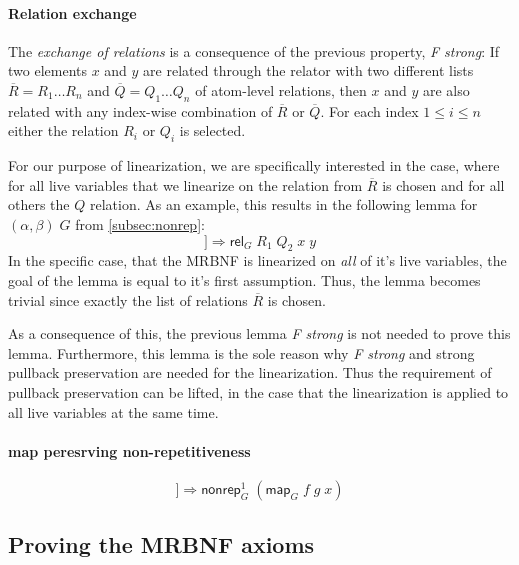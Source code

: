     \paragraph{Relation exchange}
    \label{par:rel_exchange}
      The \textit{exchange of relations} is a consequence of the previous property, \textit{F strong}: If two elements $x$ and $y$ are related through the relator with two different lists $\overline{R} = R_1 \dots R_n$ and $\overline{Q} = Q_1 \dots Q_n$ of atom-level relations, then $x$ and $y$ are also related with any index-wise combination of $\overline{R}$ or $\overline{Q}$. For each index $1 \leq i \leq n$ either the relation $R_i$ or $Q_i$ is selected. 
      
      For our purpose of linearization, we are specifically interested in the case, where for all live variables that we linearize on the relation from $\overline{R}$ is chosen and for all others the $Q$ relation. As an example, this results in the following lemma for $(\alpha, \beta)\; G$ from \autoref{subsec:nonrep}:
      \begin{equation*}
        [\![\textsf{rel}_G\; R_1\; R_2\; x\; y;\; \textsf{rel}_G\; Q_1\; Q_2\; x\; y]\!] \Longrightarrow \textsf{rel}_G\; R_1\; Q_2\; x\; y
      \end{equation*} 
      In the specific case, that the \ac{MRBNF} is linearized on \textit{all} of it's live variables, the goal of the lemma is equal to it's first assumption. Thus, the lemma becomes trivial since exactly the list of relations $\overline{R}$ is chosen.

      As a consequence of this, the previous lemma \textit{F strong} is not needed to prove this lemma. Furthermore, this lemma is the sole reason why \textit{F strong} and strong pullback preservation are needed for the linearization. Thus the requirement of pullback preservation can be lifted, in the case that the linearization is applied to all live variables at the same time.

    \paragraph{map peresrving non-repetitiveness}
      \begin{equation*}
        [\![\textsf{nonrep}_G^1\; x;\; \textsf{bijective} f]\!] \Longrightarrow \textsf{nonrep}_G^1\; (\textsf{map}_G\; f\; g\; x)
      \end{equation*} 
      
  \subsection{Proving the MRBNF axioms}

